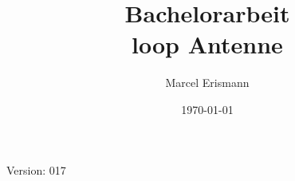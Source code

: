 \documentclass[10pt,a4paper]{article}
\author{Marcel Erismann}
\date{\today}
\title{Bachelorarbeit \\ \footnotesize{loop Antenne}}
\begin{document}
	
	Version: 017
	\tableofcontents 
	\newpage
	
\end{document}
